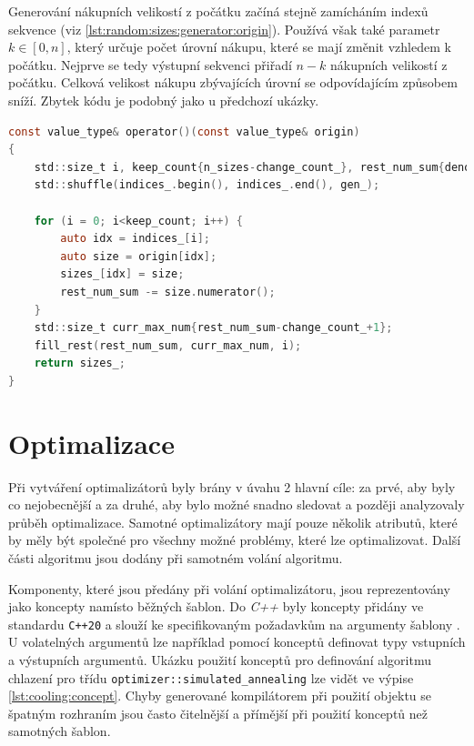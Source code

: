 Generování nákupních velikostí z počátku začíná stejně zamícháním indexů sekvence (viz \ref{lst:random:sizes:generator:origin}).
Používá však také parametr $k\in[0, n]$, který určuje počet úrovní nákupu, které se mají změnit vzhledem k počátku.
Nejprve se tedy výstupní sekvenci přiřadí $n-k$ nákupních velikostí z počátku.
Celková velikost nákupu zbývajících úrovní se odpovídajícím způsobem sníží.
Zbytek kódu je podobný jako u předchozí ukázky.

\begin{lstlisting}[caption={~Metody pro náhodné generování velikostí nákupu od počátku},label={lst:random:sizes:generator:origin},captionpos=t,abovecaptionskip=-\medskipamount,belowcaptionskip=\medskipamount,language=C]
const value_type& operator()(const value_type& origin)
{
    std::size_t i, keep_count{n_sizes-change_count_}, rest_num_sum{denom_};
    std::shuffle(indices_.begin(), indices_.end(), gen_);

    for (i = 0; i<keep_count; i++) {
        auto idx = indices_[i];
        auto size = origin[idx];
        sizes_[idx] = size;
        rest_num_sum -= size.numerator();
    }
    std::size_t curr_max_num{rest_num_sum-change_count_+1};
    fill_rest(rest_num_sum, curr_max_num, i);
    return sizes_;
}
\end{lstlisting}

\chapter{Optimalizace}
Při vytváření optimalizátorů byly brány v úvahu 2 hlavní cíle: za prvé, aby byly co nejobecnější a za druhé, aby bylo možné snadno sledovat a později analyzovaly průběh optimalizace.
Samotné optimalizátory mají pouze několik atributů, které by měly být společné pro všechny možné problémy, které lze optimalizovat.
Další části algoritmu jsou dodány při samotném volání algoritmu.

Komponenty, které jsou předány při volání optimalizátoru, jsou reprezentovány jako koncepty namísto běžných šablon.
Do \textit{C++} byly koncepty přidány ve standardu \texttt{C++20} a slouží ke specifikovaným požadavkům na argumenty šablony \cite{concepts}.
U volatelných argumentů lze například pomocí konceptů definovat typy vstupních a výstupních argumentů.
Ukázku použití konceptů pro definování algoritmu chlazení pro třídu \texttt{optimizer::simulated\_annealing} lze vidět ve výpise \ref{lst:cooling:concept}.
Chyby generované kompilátorem při použití objektu se špatným rozhraním jsou často čitelnější a přímější při použití konceptů než samotných šablon.

